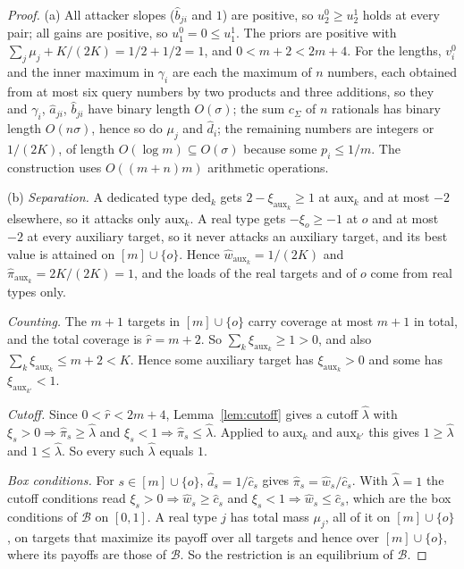 \begin{proof}
(a) All attacker slopes ($\hat b_{ji}$ and $1$) are positive, so $u_2^0\ge u_2^1$ holds at every pair;
all gains are positive, so $u_1^0=0\le u_1^1$. The priors are positive with
$\sum_j\mu_j+K/(2K)=1/2+1/2=1$, and $0<m+2<2m+4$. For the lengths, $v_i^0$ and the inner maximum in
$\gamma_i$ are each the maximum of $n$ numbers, each obtained from at most six query numbers by two
products and three additions, so they and $\gamma_i$, $\hat a_{ji}$, $\hat b_{ji}$ have binary length
$O(\sigma)$; the sum $c_\Sigma$ of $n$ rationals has binary length $O(n\sigma)$, hence so do $\mu_j$ and
$\hat d_i$; the remaining numbers are integers or $1/(2K)$, of length $O(\log m)\subseteq O(\sigma)$
because some $p_i\le1/m$. The construction uses $O((m+n)m)$ arithmetic operations.

(b) \emph{Separation.} A dedicated type $\mathrm{ded}_k$ gets $2-\xi_{\mathrm{aux}_k}\ge1$ at
$\mathrm{aux}_k$ and at most $-2$ elsewhere, so it attacks only $\mathrm{aux}_k$. A real type gets
$-\xi_o\ge-1$ at $o$ and at most $-2$ at every auxiliary target, so it never attacks an auxiliary target,
and its best value is attained on $[m]\cup\{o\}$. Hence $\hat w_{\mathrm{aux}_k}=1/(2K)$ and
$\hat\pi_{\mathrm{aux}_k}=2K/(2K)=1$, and the loads of the real targets and of $o$ come from real types
only.

\emph{Counting.} The $m+1$ targets in $[m]\cup\{o\}$ carry coverage at most $m+1$ in total, and the total
coverage is $\hat r=m+2$. So $\sum_k\xi_{\mathrm{aux}_k}\ge1>0$, and also
$\sum_k\xi_{\mathrm{aux}_k}\le m+2<K$. Hence some auxiliary target has $\xi_{\mathrm{aux}_k}>0$ and some
has $\xi_{\mathrm{aux}_{k'}}<1$.

\emph{Cutoff.} Since $0<\hat r<2m+4$, Lemma~\ref{lem:cutoff} gives a cutoff $\hat\lambda$ with
$\xi_s>0\Rightarrow\hat\pi_s\ge\hat\lambda$ and $\xi_s<1\Rightarrow\hat\pi_s\le\hat\lambda$. Applied to
$\mathrm{aux}_k$ and $\mathrm{aux}_{k'}$ this gives $1\ge\hat\lambda$ and $1\le\hat\lambda$. So every such
$\hat\lambda$ equals $1$.

\emph{Box conditions.} For $s\in[m]\cup\{o\}$, $\hat d_s=1/\hat c_s$ gives $\hat\pi_s=\hat w_s/\hat c_s$.
With $\hat\lambda=1$ the cutoff conditions read $\xi_s>0\Rightarrow\hat w_s\ge\hat c_s$ and
$\xi_s<1\Rightarrow\hat w_s\le\hat c_s$, which are the box conditions of $\mathcal B$ on $[0,1]$. A real
type $j$ has total mass $\mu_j$, all of it on $[m]\cup\{o\}$, on targets that maximize its payoff over all
targets and hence over $[m]\cup\{o\}$, where its payoffs are those of $\mathcal B$. So the restriction is
an equilibrium of $\mathcal B$.


\end{proof}

